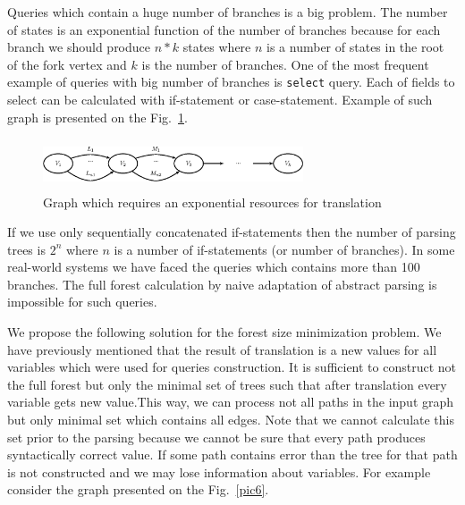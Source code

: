 Queries which contain a huge number of branches is a big problem. The number of states is an 
exponential function of the number of branches because for each branch we should produce $n*k$ 
states where $n$ is a number of states in the root of the fork vertex and $k$ is the number 
of branches. One of the most frequent example of queries with big number of branches 
is \verb|select| query. Each of fields to select can be calculated with if-statement 
or case-statement. Example of such graph is presented on the Fig.~\ref{pic5}.

\begin{figure}
    \begin{center}
        \includegraphics[width=7.7cm,height=1.5cm]{graphs/big_res.eps}
        \caption{Graph which requires an exponential resources for translation}
        \label{pic5}
    \end{center}
\end{figure}

If we use only sequentially concatenated if-statements then the number of parsing trees is $2^n$ 
where $n$ is a number of if-statements (or number of branches). In some real-world systems we 
have faced the queries which contains more than 100 branches. The full forest calculation by naive 
adaptation of abstract parsing is impossible for such queries. 



We propose the following solution for the forest size minimization problem. We have previously mentioned 
that the result of translation is a new values for all variables which were used for queries construction. 
It is sufficient to construct not the full forest but only the minimal set of trees such that after 
translation every variable gets new value.This way, we can process not all paths in the input graph 
but only minimal set which contains all edges. Note that we cannot calculate this set prior to the parsing 
because we cannot be sure that every path produces syntactically correct value. If some path contains 
error than the tree for that path is not constructed and we may lose information about variables. 
For example consider the graph presented on the Fig.~\ref{pic6}.

